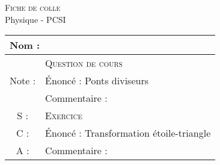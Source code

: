 \documentclass[a4paper,11pt]{book}
\renewcommand{\classe}{PCSI}
\renewcommand{\classe}{PCSI}
\newcommand{\heig}{2cm}
\begin{document}
\newcommand{\Coursun}{Ponts diviseurs}
\newcommand{\Coursdeux}{Dipôles électrocinétiques}
\newcommand{\Courstrois}{Définitions et lois générales dans le cadre de l’ARQS}
\newcommand{\Exoun}{Transformation étoile-triangle}
\newcommand{\Exodeux}{Tension et intensité dans un circuit résistif simple}
\newcommand{\Exotrois}{Comparateur de tension}


\vspace{-2cm}
\begin{center}
\textsc{Fiche de colle}\\
Physique - \classe
\end{center}
\vspace{-0.9cm}
\begin{minipage}{0.48\textwidth}
\end{minipage}\hfill
\begin{minipage}{0.48\textwidth}
\end{minipage}
\vspace{0.2cm}

\centering
\begin{tabularx}{\textwidth}{|c|X|}
\hline
\multicolumn{2}{|l|}{\begin{minipage}{2cm}Nom :\hspace{1.2cm}\end{minipage}} \\[0.2cm]
\hline
\multirow{3}{*}{Note :\hspace{1.2cm}} & \textsc{Question de cours} \\[0.1cm]
 & Énoncé : \Coursun \\[0.1cm]
 & Commentaire : \\[\heig]
 \cline{2-2}
S :\hspace{1.2cm} & \textsc{Exercice} \\[0.1cm]
C :\hspace{1.2cm} & Énoncé : \Exoun \\[0.1cm]
A :\hspace{1.2cm} & Commentaire : \\[\heig]
\hline
\end{tabularx}
\end{document}
